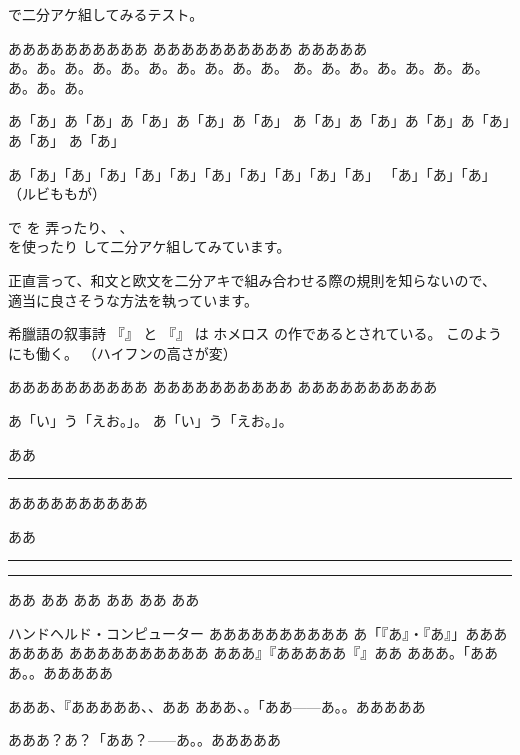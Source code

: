 \documentclass[12pt,landscape,hiragino-pro]{ltjtarticle}
\begin{document}

で二分アケ組してみるテスト。

ああああああああああ
あああああああああ\allowbreak あ
あああああ\\
あ。あ。あ。あ。あ。あ。あ。あ。あ。あ。
あ。あ。あ。あ。あ。あ。あ。あ。あ。あ。

あ「あ」あ「あ」あ「あ」あ「あ」あ「あ」
あ「あ」あ「あ」あ「あ」あ「あ」あ「あ」
あ「あ」

あ「あ」「あ」「あ」「あ」「あ」「あ」「あ」「あ」「あ」「あ」
「あ」「あ」「あ」（ルビももが）

で
を
弄ったり、
、\\
を使ったり
して二分アケ組してみています。

正直言って、和文と欧文を二分アキで組み合わせる際の規則を知らないので、
適当に良さそうな方法を執っています。


希臘語の叙事詩
『』%
と
『』%
は
ホメロス%
の作であるとされている。
このようにも働く。
（ハイフンの高さが変）


ああああああああああ%
ああああああああああ%
ああああああああああ%

あ「い」う「えお。」。
あ「い」う「えお。」。

ああ\rule{\zw}{1pt}%
ああああああああああ

ああ\rule{\intcalcShr{\zw} sp}{1pt}\rule{\intcalcSub{\zw}{\intcalcShr{\zw}} sp}{1pt}%
ああ\sibuNoalign{}%
ああ%
ああ%
ああ%
ああ%
ああ%

ハンドヘルド・コンピューター
ああああああああああ
あ「『あ』・『あ』」あああああああ
ああああああああああ
あああ』『あああああ『』ああ
あああ。「あああ。。あああああ

あああ、『あああああ、、ああ
あああ、。「ああ——あ。。あああああ

あああ？あ？「ああ？——あ。。あああああ
\end{document}
